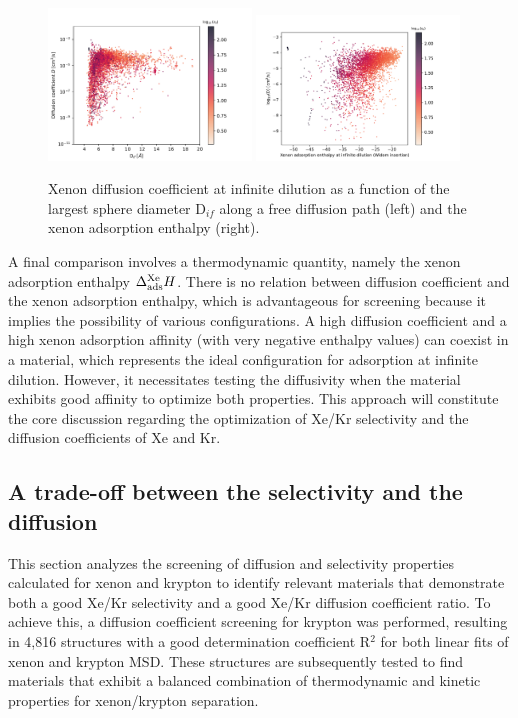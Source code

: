 \documentclass[main]{subfiles}
\begin{document}
\begin{figure}[ht]
  \centering
    \includegraphics[width=0.48\textwidth]{figures/5-diffusion/D_log-lcd_s_+.pdf}
    \includegraphics[width=0.48\textwidth]{figures/5-diffusion/D_log-H_Xe_s_+.pdf}
    \caption{Xenon diffusion coefficient at infinite dilution as a function of the largest sphere diameter D$_{if}$ along a free diffusion path (left) and the xenon adsorption enthalpy (right). }\label{fgr:diff_H_lcd}
\end{figure}

A final comparison involves a thermodynamic quantity, namely the xenon adsorption enthalpy $\Delta_{\text{ads}}^{\text{Xe}}H$. There is no relation between diffusion coefficient and the xenon adsorption enthalpy, which is advantageous for screening because it implies the possibility of various configurations. A high diffusion coefficient and a high xenon adsorption affinity (with very negative enthalpy values) can coexist in a material, which represents the ideal configuration for adsorption at infinite dilution. However, it necessitates testing the diffusivity when the material exhibits good affinity to optimize both properties. This approach will constitute the core discussion regarding the optimization of Xe/Kr selectivity and the diffusion coefficients of Xe and Kr.  

\subsection{A trade-off between the selectivity and the diffusion}

This section analyzes the screening of diffusion and selectivity properties calculated for xenon and krypton to identify relevant materials that demonstrate both a good Xe/Kr selectivity and a good Xe/Kr diffusion coefficient ratio. To achieve this, a diffusion coefficient screening for krypton was performed, resulting in 4,816 structures with a good determination coefficient R$^2$ for both linear fits of xenon and krypton MSD. These structures are subsequently tested to find materials that exhibit a balanced combination of thermodynamic and kinetic properties for xenon/krypton separation.
\end{document}
